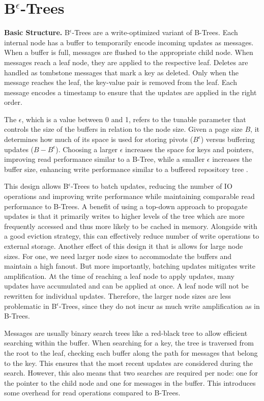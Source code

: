 \section{B$^\epsilon$-Trees}
\textbf{Basic Structure.}
B$^\epsilon$-Trees \cite{bender2015epsilon} are a write-optimized variant of B-Trees.
Each internal node has a buffer to temporarily encode incoming updates as messages.
When a buffer is full, messages are flushed to the appropriate child node.
When messages reach a leaf node, they are applied to the respective leaf.
Deletes are handled as tombstone messages that mark a key as deleted. Only when the message reaches the leaf, the key-value pair is removed from the leaf.
Each message encodes a timestamp to ensure that the updates are applied in the right order.

The $\epsilon$, which is a value between 0 and 1, refers to the tunable parameter that controls the size of the buffers in relation to the node size.
Given a page size $B$, it determines how much of its space is used for storing pivots ($B^\epsilon$) versus buffering updates ($B - B^\epsilon$).
Choosing a larger $\epsilon$ increases the space for keys and pointers, improving read performance similar to a B-Tree, while a smaller $\epsilon$ increases the buffer size, enhancing write performance similar to a buffered repository tree \cite{buchsbaum2000external}.

This design allows B$^\epsilon$-Trees to batch updates, reducing the number of \ac{IO} operations and improving write performance while maintaining comparable read performance to B-Trees.
A benefit of using a top-down approach to propagate updates is that it primarily writes to higher levels of the tree which are more frequently accessed and thus more likely to be cached in memory.
Alongside with a good eviction strategy, this can effectively reduce number of write operations to external storage.
Another effect of this design it that is allows for large node sizes.
For one, we need larger node sizes to accommodate the buffers and maintain a high fanout.
But more importantly, batching updates mitigates write amplification.
At the time of reaching a leaf node to apply updates, many updates have accumulated and can be applied at once. 
A leaf node will not be rewritten for individual updates. 
Therefore, the larger node sizes are less problematic in B$^\epsilon$-Trees, since they do not incur as much write amplification as in B-Trees.

Messages are usually binary search trees like a red-black tree to allow efficient searching within the buffer.
When searching for a key, the tree is traversed from the root to the leaf, checking each buffer along the path for messages that belong to the key.
This ensures that the most recent updates are considered during the search.
However, this also means that two searches are required per node: one for the pointer to the child node and one for messages in the buffer.
This introduces some overhead for read operations compared to B-Trees.

